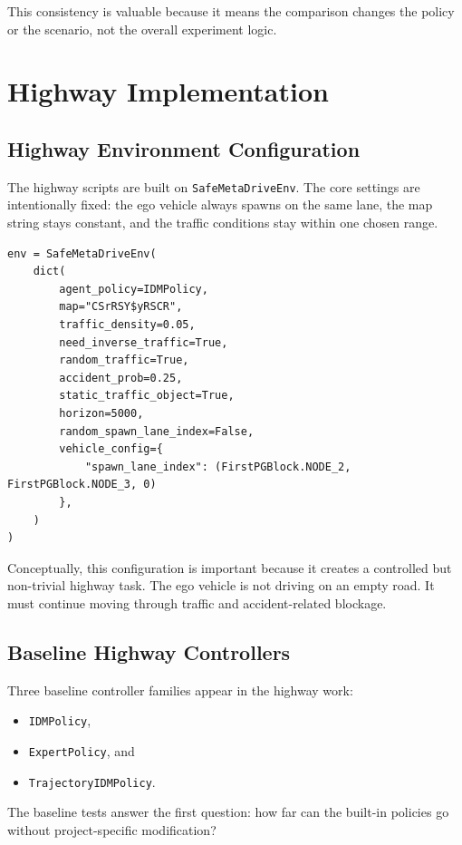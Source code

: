 \documentclass[12pt,a4paper]{report}
\begin{document}
This consistency is valuable because it means the comparison changes the policy or the scenario, not the overall experiment logic.

\section{Highway Implementation}

\subsection{Highway Environment Configuration}
The highway scripts are built on \texttt{SafeMetaDriveEnv}. The core settings are intentionally fixed: the ego vehicle always spawns on the same lane, the map string stays constant, and the traffic conditions stay within one chosen range.

\begin{lstlisting}[caption={Representative highway configuration logic.},label={lst:highway_config},float=H]
env = SafeMetaDriveEnv(
    dict(
        agent_policy=IDMPolicy,
        map="CSrRSY$yRSCR",
        traffic_density=0.05,
        need_inverse_traffic=True,
        random_traffic=True,
        accident_prob=0.25,
        static_traffic_object=True,
        horizon=5000,
        random_spawn_lane_index=False,
        vehicle_config={
            "spawn_lane_index": (FirstPGBlock.NODE_2, FirstPGBlock.NODE_3, 0)
        },
    )
)
\end{lstlisting}

Conceptually, this configuration is important because it creates a controlled but non-trivial highway task. The ego vehicle is not driving on an empty road. It must continue moving through traffic and accident-related blockage.

\subsection{Baseline Highway Controllers}
Three baseline controller families appear in the highway work:

\begin{itemize}
    \item \texttt{IDMPolicy},
    \item \texttt{ExpertPolicy}, and
    \item \texttt{TrajectoryIDMPolicy}.
\end{itemize}

The baseline tests answer the first question: how far can the built-in policies go without project-specific modification?
\end{document}
